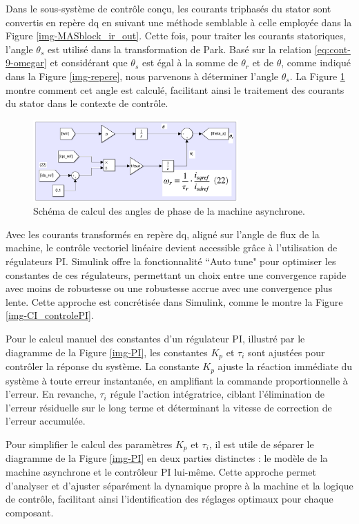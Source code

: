 Dans le sous-système de contrôle conçu, les courants triphasés du stator sont convertis en repère dq en suivant une méthode semblable à celle employée dans la Figure \ref{img-MASblock_ir_out}. Cette fois, pour traiter les courants statoriques, l'angle $\theta_s$ est utilisé dans la transformation de Park. Basé sur la relation \ref{eq:cont-9-omegar} et considérant que $\theta_s$ est égal à la somme de $\theta_r$ et de $\theta$, comme indiqué dans la Figure \ref{img-repere}, nous parvenons à déterminer l'angle $\theta_s$. La Figure \ref{img-CI_calculThetas} montre comment cet angle est calculé, facilitant ainsi le traitement des courants du stator dans le contexte de contrôle.


\begin{figure}[!h]
    \centering
    \includegraphics[width=0.7\textwidth]{imgsMATLAB/MAS/CI/CI_calculThetas.png} 
    \caption{Schéma de calcul des angles de phase de la machine asynchrone.}
    \label{img-CI_calculThetas}
\end{figure}

Avec les courants transformés en repère dq, aligné sur l'angle de flux de la machine, le contrôle vectoriel linéaire devient accessible grâce à l'utilisation de régulateurs PI. Simulink offre la fonctionnalité ``Auto tune" pour optimiser les constantes de ces régulateurs, permettant un choix entre une convergence rapide avec moins de robustesse ou une robustesse accrue avec une convergence plus lente. Cette approche est concrétisée dans Simulink, comme le montre la Figure \ref{img-CI_controlePI}.


Pour le calcul manuel des constantes d'un régulateur PI, illustré par le diagramme de la Figure \ref{img-PI}, les constantes \( K_p \) et \( \tau_i \) sont ajustées pour contrôler la réponse du système. La constante \( K_p \) ajuste la réaction immédiate du système à toute erreur instantanée, en amplifiant la commande proportionnelle à l'erreur. En revanche, \( \tau_i \) régule l'action intégratrice, ciblant l'élimination de l'erreur résiduelle sur le long terme et déterminant la vitesse de correction de l'erreur accumulée.


Pour simplifier le calcul des paramètres \( K_p \) et \( \tau_i \), il est utile de séparer le diagramme de la Figure \ref{img-PI} en deux parties distinctes : le modèle de la machine asynchrone et le contrôleur PI lui-même. Cette approche permet d'analyser et d'ajuster séparément la dynamique propre à la machine et la logique de contrôle, facilitant ainsi l'identification des réglages optimaux pour chaque composant. 

